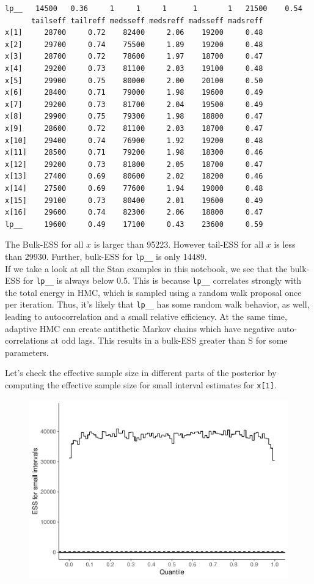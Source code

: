 \documentclass[american,]{article}
\begin{document}
\begin{verbatim}
lp__   14500   0.36     1     1     1      1       1   21500    0.54
      tailseff tailreff medsseff medsreff madsseff madsreff
x[1]     28700     0.72    82400     2.06    19200     0.48
x[2]     29700     0.74    75500     1.89    19200     0.48
x[3]     28700     0.72    78600     1.97    18700     0.47
x[4]     29200     0.73    81100     2.03    19100     0.48
x[5]     29900     0.75    80000     2.00    20100     0.50
x[6]     28400     0.71    79000     1.98    19600     0.49
x[7]     29200     0.73    81700     2.04    19500     0.49
x[8]     29900     0.75    79300     1.98    18800     0.47
x[9]     28600     0.72    81100     2.03    18700     0.47
x[10]    29400     0.74    76900     1.92    19200     0.48
x[11]    28500     0.71    79200     1.98    18300     0.46
x[12]    29200     0.73    81800     2.05    18700     0.47
x[13]    27400     0.69    80600     2.02    18200     0.46
x[14]    27500     0.69    77600     1.94    19000     0.48
x[15]    29100     0.73    80400     2.01    19600     0.49
x[16]    29600     0.74    82300     2.06    18800     0.47
lp__     19600     0.49    17100     0.43    23600     0.59
\end{verbatim}

The Bulk-ESS for all \(x\) is larger than 95223. However tail-ESS for
all \(x\) is less than 29930. Further, bulk-ESS for \texttt{lp\_\_} is
only 14489.\\
If we take a look at all the Stan examples in this notebook, we see that
the bulk-ESS for \texttt{lp\_\_} is always below 0.5. This is because
\texttt{lp\_\_} correlates strongly with the total energy in HMC, which
is sampled using a random walk proposal once per iteration. Thus, it's
likely that \texttt{lp\_\_} has some random walk behavior, as well,
leading to autocorrelation and a small relative efficiency. At the same
time, adaptive HMC can create antithetic Markov chains which have
negative auto-correlations at odd lags. This results in a bulk-ESS
greater than S for some parameters.

Let's check the effective sample size in different parts of the
posterior by computing the effective sample size for small interval
estimates for \texttt{x{[}1{]}}.

\begin{figure}[t]
  \centering
  \includegraphics[width=0.6\linewidth]{graphics/local-ess-fit-n-1.pdf}
\end{figure}
\end{document}
